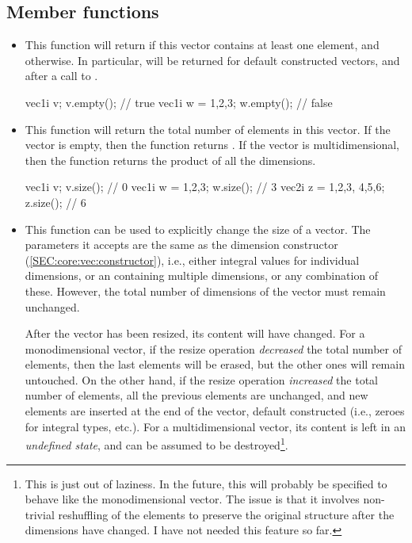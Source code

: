 \documentclass[12pt]{report}
\newenvironment{example}
{
    \begin{mdframed}[style=example,frametitle={Example}]
}
{
    \end{mdframed}
}
\begin{document}
\subsection{Member functions \label{SEC:core:vec:member_fun}}

\begin{itemize}
\item {}

This function will return  if this vector contains at least one element, and  otherwise. In particular,  will be returned for default constructed vectors, and after a call to .

\begin{example}
\begin{cppcode}
vec1i v;
v.empty(); // true
vec1i w = {1,2,3};
w.empty(); // false
\end{cppcode}
\end{example}

\item {}

This function will return the total number of elements in this vector. If the vector is empty, then the function returns . If the vector is multidimensional, then the function returns the product of all the dimensions.

\begin{example}
\begin{cppcode}
vec1i v;
v.size(); // 0
vec1i w = {1,2,3};
w.size(); // 3
vec2i z = {{1,2,3}, {4,5,6}};
z.size(); // 6
\end{cppcode}
\end{example}

\item {}

This function can be used to explicitly change the size of a vector. The parameters it accepts are the same as the dimension constructor (\ref{SEC:core:vec:constructor}), i.e., either integral values for individual dimensions, or an  containing multiple dimensions, or any combination of these. However, the total number of dimensions of the vector must remain unchanged.

After the vector has been resized, its content will have changed. For a monodimensional vector, if the resize operation \emph{decreased} the total number of elements, then the last elements will be erased, but the other ones will remain untouched. On the other hand, if the resize operation \emph{increased} the total number of elements, all the previous elements are unchanged, and new elements are inserted at the end of the vector, default constructed (i.e., zeroes for integral types, etc.). For a multidimensional vector, its content is left in an \emph{undefined state}, and can be assumed to be destroyed\footnote{This is just out of laziness. In the future, this will probably be specified to behave like the monodimensional vector. The issue is that it involves non-trivial reshuffling of the elements to preserve the original structure after the dimensions have changed. I have not needed this feature so far.}.


\end{itemize}
\end{document}
